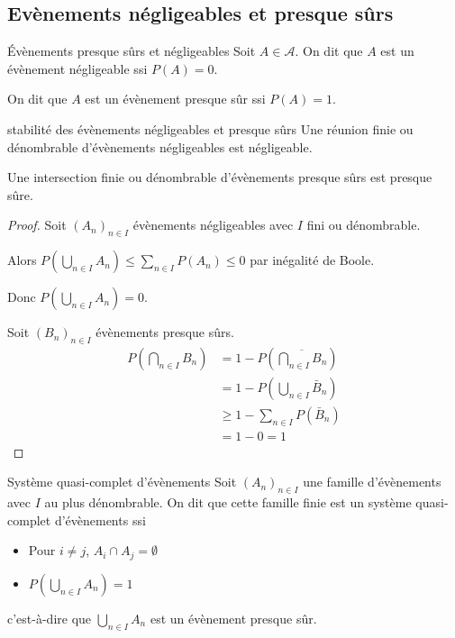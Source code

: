 \subsection{Evènements négligeables et presque sûrs }

\begin{definition}{Évènements presque sûrs et négligeables}{}
    Soit $A \in \mathcal A$. On dit que $A$ est un évènement négligeable ssi $P(A) = 0$.

    On dit que $A$ est un évènement presque sûr ssi $P(A) = 1$.
\end{definition}

\begin{proposition}{}{stabilité des évènements négligeables et presque sûrs}{}
    Une réunion finie ou dénombrable d'évènements négligeables est négligeable. 

    Une intersection finie ou dénombrable d'évènements presque sûrs est presque sûre.
\end{proposition}


\begin{proof}
    Soit $(A_n)_{n \in I}$ évènements négligeables avec $I$ fini ou dénombrable.

    Alors $\displaystyle P\left( \bigcup_{n \in I} A_n \right) \leqslant \sum_{n \in I} P(A_n) \leqslant 0$
    par inégalité de Boole.

    Donc $\displaystyle P\left( \bigcup_{n \in I} A_n \right) = 0$. 

    Soit $(B_n)_{n \in I}$ évènements presque sûrs. 
    \begin{align}
        P\left( \bigcap_{n \in I} B_n \right) & = 1 - P\left( \overline{ \bigcap_{n \in I} B_n } \right) \\
        & = 1 - P\left( \bigcup_{n \in I} \bar B_n \right) \\
        & \geqslant 1 - \sum_{n \in I} P(\bar B_n) \\
        & = 1 - 0 = 1
    \end{align}

\end{proof}

\begin{definition}{Système quasi-complet d'évènements}{}
    Soit $(A_n)_{n \in I}$ une famille d'évènements avec $I$ au plus dénombrable. On dit que cette famille
    finie est un système quasi-complet d'évènements ssi 
    \begin{itemize}
        \item Pour $i \neq j$, $A_i \cap A_j = \emptyset$
        \item $\displaystyle P\left( \bigcup_{n \in I} A_n \right) = 1$
    \end{itemize}

    c'est-à-dire que $\displaystyle \bigcup_{n \in I} A_n$ est un évènement presque sûr.
\end{definition}

